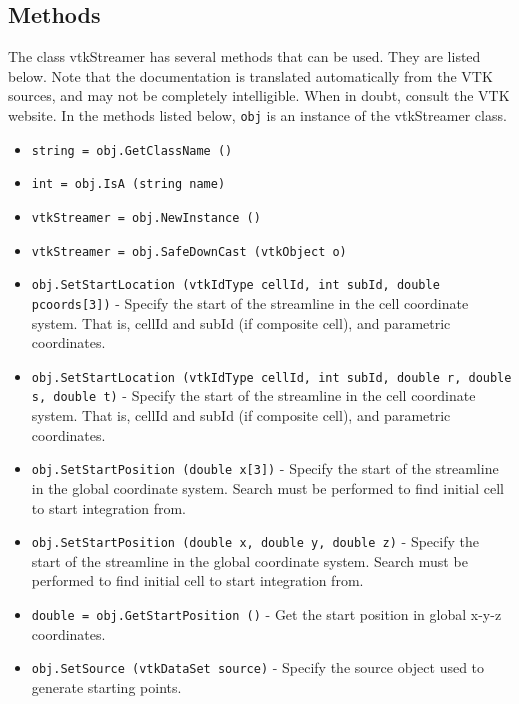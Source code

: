 \subsection{Methods}

The class vtkStreamer has several methods that can be used.
  They are listed below.
Note that the documentation is translated automatically from the VTK sources,
and may not be completely intelligible.  When in doubt, consult the VTK website.
In the methods listed below, \verb|obj| is an instance of the vtkStreamer class.
\begin{itemize}
\item  \verb|string = obj.GetClassName ()|

\item  \verb|int = obj.IsA (string name)|

\item  \verb|vtkStreamer = obj.NewInstance ()|

\item  \verb|vtkStreamer = obj.SafeDownCast (vtkObject o)|

\item  \verb|obj.SetStartLocation (vtkIdType cellId, int subId, double pcoords[3])| -  Specify the start of the streamline in the cell coordinate system. That
 is, cellId and subId (if composite cell), and parametric coordinates.

\item  \verb|obj.SetStartLocation (vtkIdType cellId, int subId, double r, double s, double t)| -  Specify the start of the streamline in the cell coordinate system. That
 is, cellId and subId (if composite cell), and parametric coordinates.

\item  \verb|obj.SetStartPosition (double x[3])| -  Specify the start of the streamline in the global coordinate
 system. Search must be performed to find initial cell to start
 integration from.

\item  \verb|obj.SetStartPosition (double x, double y, double z)| -  Specify the start of the streamline in the global coordinate
 system. Search must be performed to find initial cell to start
 integration from.

\item  \verb|double = obj.GetStartPosition ()| -  Get the start position in global x-y-z coordinates.

\item  \verb|obj.SetSource (vtkDataSet source)| -  Specify the source object used to generate starting points.


\end{itemize}
